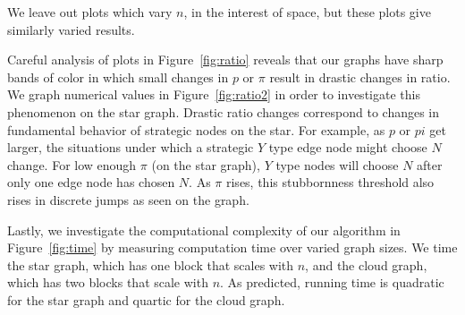 \documentclass{article}
\begin{document}
We leave out plots which vary $n$, in the interest of space, but these
plots give similarly varied results.

Careful analysis of plots in Figure~\ref{fig:ratio} reveals that our
graphs have sharp bands of color in which small changes in $p$ or
$\pi$ result in drastic changes in ratio. We graph numerical values in
Figure~\ref{fig:ratio2} in order to investigate this phenomenon on the
star graph. Drastic ratio changes correspond to changes in fundamental
behavior of strategic nodes on the star. For example, as $p$ or $pi$
get larger, the situations under which a strategic $Y$ type edge node
might choose $N$ change. For low enough $\pi$ (on the star graph), $Y$
type nodes will choose $N$ after only one edge node has chosen $N$. As
$\pi$ rises, this stubbornness threshold also rises in discrete jumps
as seen on the graph.

Lastly, we investigate the computational complexity of our algorithm
in Figure~\ref{fig:time} by measuring computation time over varied
graph sizes. We time the star graph, which has one block that scales
with $n$, and the cloud graph, which has two blocks that scale with
$n$. As predicted, running time is quadratic for the star graph and
quartic for the cloud graph.
\end{document}
